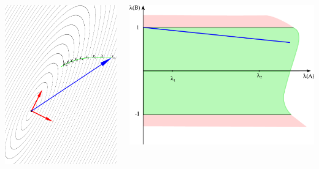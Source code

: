 \documentclass[professionalfonts,compress,unicode]{beamer}
\begin{document}
{
\begin{columns}
\begin{column}{0.5\textwidth}
\includegraphics[width=\columnwidth]{si0_05.pdf}%
\end{column}
\begin{column}{0.5\textwidth}
\includegraphics[width=\columnwidth]{lAlB0_05.pdf}%
\end{column}
\end{columns}
}
\end{document}
